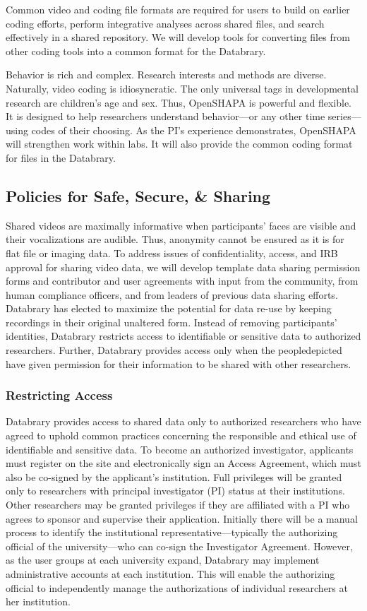 \documentclass[letterpaper,man,natbib]{apa6}
\begin{document}
Common video and coding file formats are required for users to build on earlier coding efforts, perform integrative analyses across shared files, and search effectively in a shared repository. We will develop tools for converting files from other coding tools into a common format for the Databrary.

Behavior is rich and complex. Research interests and methods are diverse. Naturally, video coding is idiosyncratic. The only universal tags in developmental research are children’s age and sex. Thus, OpenSHAPA is powerful and flexible. It is designed to help researchers understand behavior—or any other time series—using codes of their choosing. As the PI's experience demonstrates, OpenSHAPA will strengthen work within labs. It will also provide the common coding format for files in the Databrary.
\subsection{Policies for Safe, Secure, \& Sharing}
Shared videos are maximally informative when participants’ faces are visible and their vocalizations are audible. Thus, anonymity cannot be ensured as it is for flat file or imaging data. 
To address issues of confidentiality, access, and IRB approval for sharing video data, we will develop template data sharing permission forms and contributor and user agreements with input from the community, from human compliance officers, and from leaders of previous data sharing efforts.
Databrary has elected to maximize the potential for data re-use by keeping recordings in their original
unaltered form. 
Instead of removing participants’ identities, Databrary restricts access to identifiable or sensitive data to authorized researchers. 
Further, Databrary provides access only when the peopledepicted have given permission for their information to be shared with other researchers.
\subsubsection{Restricting Access}
Databrary provides access to shared data only to authorized researchers who have agreed to uphold common practices concerning the responsible and ethical use of identifiable and sensitive data. 
To become an authorized investigator, applicants must register on the site and electronically sign an Access Agreement, which must also be co-signed by the applicant’s institution. 
Full privileges will be granted only to researchers with principal investigator (PI) status
at their institutions. 
Other researchers may be granted privileges if they are affiliated with a PI who agrees to sponsor and supervise their application. 
Initially there will be a manual process to identify the institutional representative—typically the authorizing official of the university—who can co-sign the Investigator Agreement. 
However, as the user groups at each university expand, Databrary may implement
administrative accounts at each institution. 
This will enable the authorizing official to independently manage the authorizations of
individual researchers at her institution.
\end{document}
